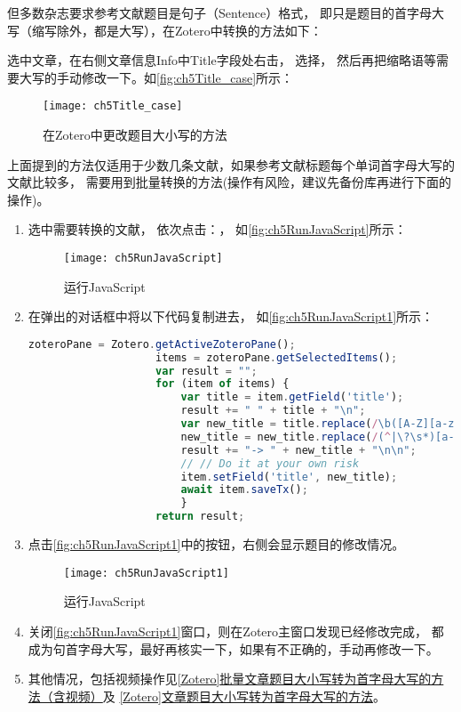 \documentclass[cn,11pt,chinese]{elegantbook}
\begin{document}
			但多数杂志要求参考文献题目是句子（Sentence）格式，
			即只是题目的首字母大写（缩写除外，都是大写），在Zotero中转换的方法如下：
			
			选中文章，在右侧文章信息Info中Title字段处右击，
			选择，
			然后再把缩略语等需要大写的手动修改一下。如\autoref{fig:ch5Title_case}所示：
			
				\begin{figure}[htbp]
					\centering
					\texttt{[image: ch5Title\_case]}
					\caption{在Zotero中更改题目大小写的方法}
					\label{fig:ch5Title_case}
				\end{figure}

				
			上面提到的方法仅适用于少数几条文献，如果参考文献标题每个单词首字母大写的文献比较多，
			需要用到批量转换的方法(操作有风险，建议先备份库再进行下面的操作)。
			\begin{enumerate}
				\item 选中需要转换的文献，
				依次点击：，
				如\autoref{fig:ch5RunJavaScript}所示：

				  \begin{figure}[htbp]
					  \centering
					  \texttt{[image: ch5RunJavaScript]}
					  \caption{运行JavaScript}
					  \label{fig:ch5RunJavaScript}
				  \end{figure}
				\item 在弹出的对话框中将以下代码复制进去，
				如\autoref{fig:ch5RunJavaScript1}所示：
				
				\begin{lstlisting}[language=JavaScript]
					zoteroPane = Zotero.getActiveZoteroPane();
					items = zoteroPane.getSelectedItems();
					var result = "";
					for (item of items) {
						var title = item.getField('title');
						result += " " + title + "\n";
						var new_title = title.replace(/\b([A-Z][a-z0-9]+|A)\b/g, function (x) { return x.toLowerCase(); });
						new_title = new_title.replace(/(^|\?\s*)[a-z]/, function (x) { return x.toUpperCase(); });
						result += "-> " + new_title + "\n\n";
						// // Do it at your own risk
						item.setField('title', new_title);
						await item.saveTx();
						}
					return result;
				\end{lstlisting}
				\item 点击\autoref{fig:ch5RunJavaScript1}中的按钮，右侧会显示题目的修改情况。
						\begin{figure}[htbp]
							\centering
							\texttt{[image: ch5RunJavaScript1]}
							\caption{运行JavaScript}
							\label{fig:ch5RunJavaScript1}
						\end{figure}
				\item 关闭\autoref{fig:ch5RunJavaScript1}窗口，则在Zotero主窗口发现已经修改完成，
				都成为句首字母大写，最好再核实一下，如果有不正确的，手动再修改一下。
				\item 其他情况，包括视频操作见\href{https://zhuanlan.zhihu.com/p/283889592}
				{[Zotero]批量文章题目大小写转为首字母大写的方法（含视频）}及
				\href{https://zhuanlan.zhihu.com/p/60651053}
				{[Zotero]文章题目大小写转为首字母大写的方法}。
		    \end{enumerate}
			
\end{document}
